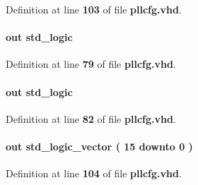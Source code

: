 Definition at line {\bf 103} of file {\bf pllcfg.\+vhd}.

\paragraph[{c0\+\_\+odddiv}]{ {\bfseries \textcolor{keywordflow}{out}\textcolor{vhdlchar}{ }} {\bfseries \textcolor{comment}{std\+\_\+logic}\textcolor{vhdlchar}{ }} \hspace{0.3cm}{\ttfamily [Port]}}\label{classpllcfg_a4b9b863fc95836676857f8b1b1573219}


Definition at line {\bf 79} of file {\bf pllcfg.\+vhd}.

\paragraph[{c1\+\_\+byp}]{ {\bfseries \textcolor{keywordflow}{out}\textcolor{vhdlchar}{ }} {\bfseries \textcolor{comment}{std\+\_\+logic}\textcolor{vhdlchar}{ }} \hspace{0.3cm}{\ttfamily [Port]}}\label{classpllcfg_af658330bf0bc010687d7dd20bddd655e}


Definition at line {\bf 82} of file {\bf pllcfg.\+vhd}.

\paragraph[{c1\+\_\+cnt}]{ {\bfseries \textcolor{keywordflow}{out}\textcolor{vhdlchar}{ }} {\bfseries \textcolor{comment}{std\+\_\+logic\+\_\+vector}\textcolor{vhdlchar}{ }\textcolor{vhdlchar}{(}\textcolor{vhdlchar}{ }\textcolor{vhdlchar}{ } \textcolor{vhdldigit}{15} \textcolor{vhdlchar}{ }\textcolor{keywordflow}{downto}\textcolor{vhdlchar}{ }\textcolor{vhdlchar}{ } \textcolor{vhdldigit}{0} \textcolor{vhdlchar}{ }\textcolor{vhdlchar}{)}\textcolor{vhdlchar}{ }} \hspace{0.3cm}{\ttfamily [Port]}}\label{classpllcfg_a42989c0b6ecdee2ddc8866fc398488c4}


Definition at line {\bf 104} of file {\bf pllcfg.\+vhd}.

